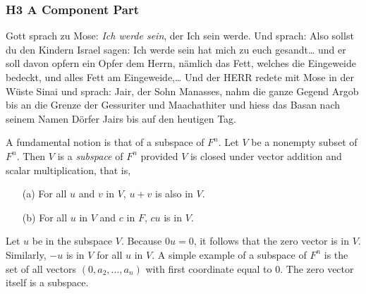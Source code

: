 \subsubsection{H3 A Component Part }
Gott sprach zu Mose:  \emph{Ich werde sein}, der Ich sein werde.
    Und sprach: Also sollst du den Kindern Israel sagen:  Ich werde
    sein \cite{mardia1979ma} hat mich zu euch gesandt\ldots
    und er soll davon opfern ein Opfer dem Herrn, n\"amlich das Fett,
    welches die Eingeweide bedeckt, und alles Fett am Eingeweide,\ldots
    Und der HERR redete mit Mose in der W\"uste Sinai und sprach:
    Jair, der Sohn Manasses, nahm die ganze Gegend Argob bis an die
    Grenze der Gessuriter und Maachathiter und hiess das Basan nach
    seinem Namen D\"orfer Jairs bis auf den heutigen Tag.
    


A fundamental notion \cite{yao2002can} is that of a subspace of $F^n$. Let $V$ be a nonempty subset of 
$F^n$. Then $V$ is a {\it subspace} of $F^n$ provided $V$ is closed 
under vector addition and scalar multiplication, that is, 
\begin{enumerate} 
\item[\rm (a)] For all $u$ and $v$ in $V$, $u+v$ is 
also in $V$. 
\item[\rm (b)] For all $u$ in $V$ and $c$ in $F$, $cu$ is 
in $V$. 
\end{enumerate} 
Let $u$ be in the subspace $V$. Because $0u=0$, 
it follows that the zero vector is in $V$. Similarly, $-u$ is in $V$ 
for all $u$ in $V$. A simple example of a subspace of $F^n$ is the set 
of all vectors $(0,a_2,\ldots,a_n)$ with first coordinate equal to 0. 
The zero vector itself is a subspace.


